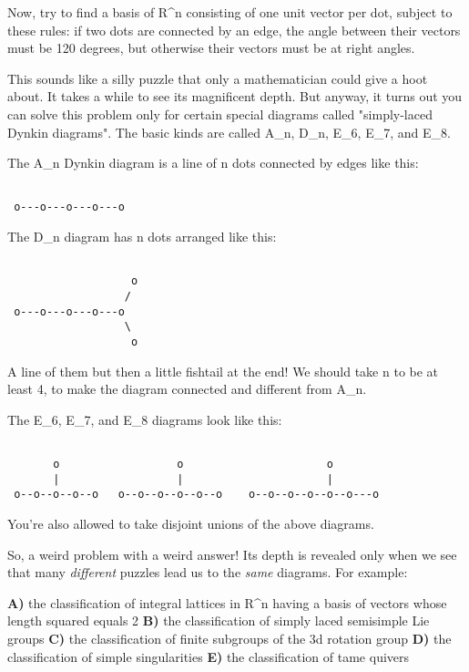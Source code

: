 Now, try to find a basis of R^{n} 
consisting of one unit vector per dot, 
subject to these rules: if two dots are connected by an edge, the angle 
between their vectors must be 120 degrees, but otherwise their vectors 
must be at right angles. 

This sounds like a silly puzzle that only a mathematician could give a 
hoot about.  It takes a while to see its magnificent depth.   But anyway, 
it turns out you can solve this problem only for certain special diagrams 
called "simply-laced Dynkin diagrams".  The basic kinds are called A_{n}, 
D_{n}, E_{6}, E_{7}, and E_{8}.

The A_{n} Dynkin diagram is a line of n dots connected by edges like this:


\begin{verbatim}

 o---o---o---o---o    
\end{verbatim}
    

The D_{n} diagram has n dots arranged like this:


\begin{verbatim}

                   o
                  /
 o---o---o---o---o
                  \
                   o
\end{verbatim}
    
A line of them but then a little fishtail at the end!  We should
take n to be at least 4, to make the diagram connected and different
from A_{n}.

The E_{6}, E_{7}, and E_{8} diagrams look like this:


\begin{verbatim}

       o                  o                      o
       |                  |                      |
 o--o--o--o--o   o--o--o--o--o--o    o--o--o--o--o--o---o
\end{verbatim}
    

You're also allowed to take disjoint unions of the above diagrams. 

So, a weird problem with a weird answer!   Its depth is revealed
only when we see that many \emph{different} puzzles lead us to the 
\emph{same}
diagrams.  For example:

\textbf{A)} the classification of integral lattices in R^{n} 
having a basis of vectors whose length squared equals 2
\textbf{B)} the classification of simply laced semisimple Lie groups 
\textbf{C)} the classification of finite subgroups of the 3d rotation group
\textbf{D)} the classification of simple singularities
\textbf{E)} the classification of tame quivers

